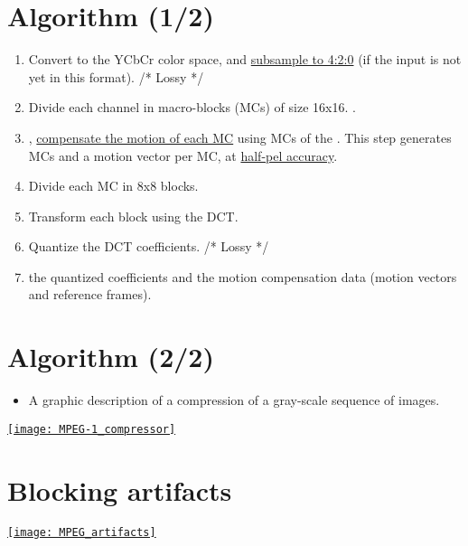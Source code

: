 \section{Algorithm (1/2)}
\label{sec:MPEG-1_algo}
\begin{enumerate}
\item Convert to the \gls{YCbCr} color space, and
  \href{https://en.wikipedia.org/wiki/Chroma_subsampling}{subsample to
    4:2:0} (if the input is not yet in this format). /* Lossy */
\item Divide each channel in macro-blocks (MCs) of size 16x16. .
\item {},
  \href{https://en.wikipedia.org/wiki/Motion_compensation#Block_motion_compensation}{compensate
    the motion of each MC} using MCs of the . This step generates
   MCs and a motion vector per MC, at
  \href{https://en.wikipedia.org/wiki/Motion_compensation}{half-pel
    accuracy}.
\item Divide each MC in 8x8 blocks.
\item Transform each block using the \gls{DCT}.
\item Quantize the \gls{DCT} coefficients. /* Lossy */
\item {} the quantized coefficients
  and the motion compensation data (motion vectors and reference
  frames).
\end{enumerate}

\section*{Algorithm (2/2)}
\begin{itemize}
\item A graphic description of a compression of a gray-scale sequence of images.
\end{itemize}
\vspace{-2ex}
\begin{center}
  \href{https://w3.ual.es/~vruiz/Docencia/Apuntes/Coding/Video/02-MPEG1/index.html}{\texttt{[image: MPEG-1\_compressor]}}
\end{center}

\section{Blocking artifacts}
\begin{center}
  \href{https://filmora.wondershare.com/video-editing/video-compression-artifacts.html}{\texttt{[image: MPEG\_artifacts]}}
\end{center}
